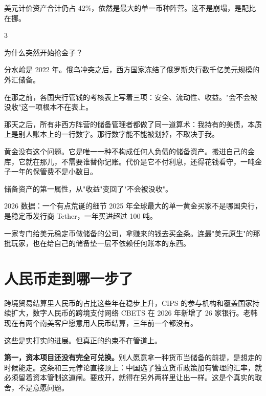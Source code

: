 美元计价资产合计仍占 42\%，依然是最大的单一币种阵营。这不是崩塌，是配比在挪。

\begin{statrow}{3}
\end{statrow}

为什么突然开始抢金子？

分水岭是 2022 年。俄乌冲突之后，西方国家冻结了俄罗斯央行数千亿美元规模的外汇储备。

在那之前，各国央行管钱的考核表上写着三项：安全、流动性、收益。"会不会被没收"这一项根本不在表上。

那天之后，所有非西方阵营的储备管理者都做了同一道算术：我持有的美债，本质上是别人账本上的一行数字。那行数字能不能被划掉，不取决于我。

黄金没有这个问题。它是唯一一种不构成任何人负债的储备资产。搬进自己的金库，它就在那儿，不需要谁替你记账。代价是它不付利息，还得花钱看守，一吨金子一年的保管费不是小数目。

\begin{pullquote}{}
储备资产的第一属性，从"收益"变回了"不会被没收"。
\end{pullquote}

\begin{databox}{2026 数据：一个有点荒诞的细节}
2025 年全球最大的单一黄金买家不是哪国央行，是稳定币发行商 Tether，一年买进超过 100 吨。

一家专门给美元稳定币做储备的公司，拿赚来的钱去买金条。连最"美元原生"的那批玩家，也在给自己的储备垫一层不依赖任何账本的东西。

\end{databox}

\section{人民币走到哪一步了}

跨境贸易结算里人民币的占比这些年在稳步上升，CIPS 的参与机构和覆盖国家持续扩大，数字人民币的跨境支付网络 CBETS 在 2026 年新增了 26 家银行。老韩现在有两个南美客户愿意用人民币结算，三年前一个都没有。

这些是实打实的进展。但真正的约束不在管道上。

\textbf{第一，资本项目还没有完全可兑换。}别人愿意拿一种货币当储备的前提，是想走的时候能走。这条和三元悖论直接顶上：中国选了独立货币政策加有管理的汇率，就必须留着资本管制这道闸。要放开，就得在另外两样里让出一样。这是个真实的取舍，不是意愿问题。

